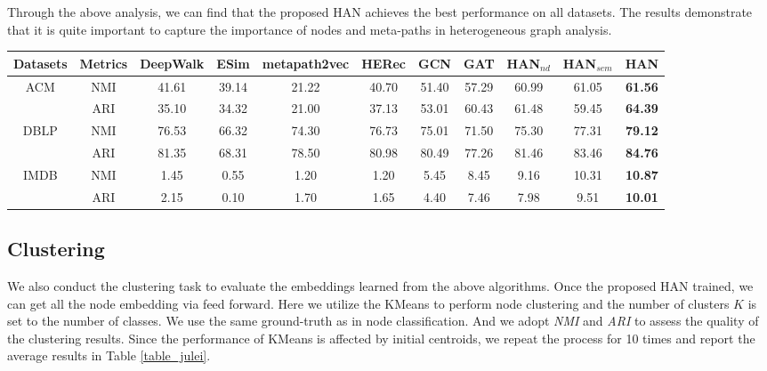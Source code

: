 Through the above analysis, we can find that the proposed HAN achieves the best performance on all datasets. The results demonstrate that it is quite important to capture the importance of nodes and meta-paths in heterogeneous graph analysis.






\begin{table*}[]
	\centering
	\caption{Qantitative results (\%) on the node clustering task.}
	\label{table_julei}
\begin{tabular}{|c|c||c|c|c|c|c|c||c|c|c|}
		\hline
		Datasets              & Metrics & DeepWalk    & ESim  & metapath2vec & HERec & GCN   & GAT   & HAN$_{nd}$ & HAN$_{sem}$ & HAN           \\ \hline
		\multirow{2}{*}{ACM}  & NMI     & 41.61 & 39.14 & 21.22  & 40.70 & 51.40 & 57.29 & 60.99       & 61.05       & \textbf{61.56} \\
		& ARI     & 35.10 & 34.32 & 21.00  & 37.13 & 53.01 & 60.43 & 61.48       & 59.45       & \textbf{64.39} \\ \hline
		\multirow{2}{*}{DBLP} & NMI     & 76.53 & 66.32 & 74.30  & 76.73 & 75.01 & 71.50 & 75.30       & 77.31       & \textbf{79.12} \\
		& ARI     & 81.35 & 68.31 & 78.50  & 80.98 & 80.49 & 77.26 & 81.46       & 83.46       & \textbf{84.76} \\ \hline
		\multirow{2}{*}{IMDB} & NMI     & 1.45  & 0.55  & 1.20   & 1.20  & 5.45  & 8.45  & 9.16        & 10.31       & \textbf{10.87} \\
		& ARI     & 2.15  & 0.10  & 1.70   & 1.65  & 4.40  & 7.46  & 7.98        & 9.51       & \textbf{10.01} \\ \hline
	\end{tabular}
\end{table*}



\subsection{Clustering}
We also conduct the clustering task to evaluate the embeddings learned from the above algorithms. 
Once the proposed HAN trained, we can get all the node embedding via feed forward.
Here we utilize the KMeans to perform node clustering and the number of clusters $K$ is set to the number of classes. We use the same ground-truth as in node classification.
And we adopt \emph{NMI} and \emph{ARI} to assess the quality of the clustering results. 
Since the performance of KMeans is affected by initial centroids, we repeat the process for 10 times and report the average results in Table \ref{table_julei}.

